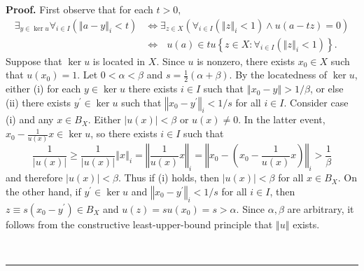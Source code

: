 \documentclass[11pt]{article}%
\newenvironment{proof}[1][Proof]{\noindent\textbf{#1.} }{\ \rule{0.5em}{0.5em}}
\begin{document}
\begin{proof}
First observe that for each $t>0,$%
\begin{align}
\exists_{y\in\ker u}\forall_{i\in I}\left(  \left\Vert a-y\right\Vert
_{i}<t\right)   &  \Leftrightarrow\exists_{z\in X}(\forall_{i\in I}(\left\Vert
z\right\Vert _{i}<1)\wedge u(a-tz)=0)\label{02a}\\
&  \Leftrightarrow\text{ }u(a)\in tu\left\{  z\in X:\forall_{i\in
I}(\left\Vert z\right\Vert _{i}<1)\right\}  .\nonumber
\end{align}
Suppose that $\ker u$ is located in $X$. Since $u$ is nonzero, there exists
$x_{0}\in X$ such that $u(x_{0})=1$. Let $0<\alpha<\beta$ and $s=\frac{1}%
{2}(\alpha+\beta)$. By the locatedness of $\ker u$, either (i) for each
$y\in\ker u$ there exists $i\in I$ such that $\left\Vert x_{0}-y\right\Vert
>1/\beta$, or else (ii) there exists $y^{\prime}\in\ker u$ such that
$\left\Vert x_{0}-y^{\prime}\right\Vert _{i}<1/s$ for all $i\in I$. Consider
case (i) and any $x\in B_{X}$. Either $\left\vert u(x)\right\vert <\beta$ or
$u(x)\neq0$. In the latter event, $x_{0}-\frac{1}{u(x)}x\in\ker u$, so there
exists $i\in I$ such that%
\[
\frac{1}{\left\vert u(x)\right\vert }\geq\frac{1}{\left\vert u(x)\right\vert
}\left\Vert x\right\Vert _{i}=\left\Vert \frac{1}{u(x)}x\right\Vert
_{i}=\left\Vert x_{0}-\left(  x_{0}-\frac{1}{u(x)}x\right)  \right\Vert
_{i}>\frac{1}{\beta}%
\]
and therefore $\left\vert u(x)\right\vert <\beta$. Thus if (i) holds, then
$\left\vert u(x)\right\vert <\beta$ for all $x\in B_{X}$. On the other hand,
if $y^{\prime}\in\ker u$ and $\left\Vert x_{0}-y^{\prime}\right\Vert _{i}<1/s$
for all $i\in I$, then $z\equiv s(x_{0}-y^{\prime})\in B_{X}$ and
$u(z)=su(x_{0})=s>\alpha$. Since $\alpha,\beta$ are arbitrary, it follows from
the constructive least-upper-bound principle \cite[2.1.18]{BVtech} that
$\left\Vert u\right\Vert $ exists.


\end{proof}
\end{document}
